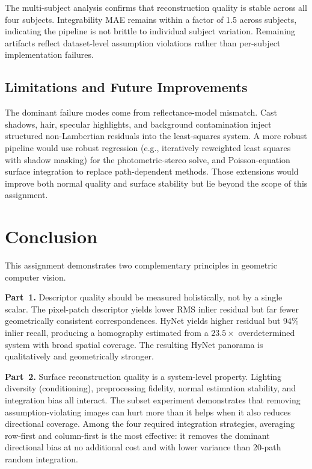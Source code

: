 {The multi-subject analysis confirms that reconstruction quality is stable across
all four subjects.  Integrability MAE remains within a factor of 1.5 across
subjects, indicating the pipeline is not brittle to individual subject variation.
Remaining artifacts reflect dataset-level assumption violations rather than
per-subject implementation failures.


\subsection*{Limitations and Future Improvements}
The dominant failure modes come from reflectance-model mismatch.  Cast shadows,
hair, specular highlights, and background contamination inject structured
non-Lambertian residuals into the least-squares system.  A more robust pipeline
would use robust regression (e.g., iteratively reweighted least squares with
shadow masking) for the photometric-stereo solve, and Poisson-equation surface
integration to replace path-dependent methods.  Those extensions would improve
both normal quality and surface stability but lie beyond the scope of this
assignment.

\section*{Conclusion}

This assignment demonstrates two complementary principles in geometric computer
vision.

\textbf{Part~1.}  Descriptor quality should be measured holistically, not by a
single scalar.  The pixel-patch descriptor yields lower RMS inlier residual but
far fewer geometrically consistent correspondences.  HyNet yields higher residual
but 94\% inlier recall, producing a homography estimated from a $23.5\times$
overdetermined system with broad spatial coverage.  The resulting HyNet panorama
is qualitatively and geometrically stronger.

\textbf{Part~2.}  Surface reconstruction quality is a system-level property.
Lighting diversity (conditioning), preprocessing fidelity, normal estimation
stability, and integration bias all interact.  The subset experiment demonstrates
that removing assumption-violating images can hurt more than it helps when it
also reduces directional coverage.  Among the four required integration strategies,
averaging row-first and column-first is the most effective: it removes the dominant
directional bias at no additional cost and with lower variance than 20-path
random integration.

}
